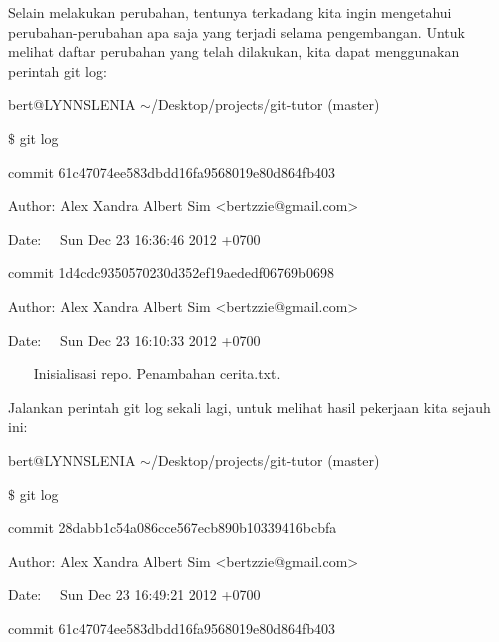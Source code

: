 \vspace{12pt}
\hspace*{0.50in}Selain melakukan perubahan, tentunya terkadang kita ingin mengetahui perubahan-perubahan apa saja yang terjadi selama pengembangan. Untuk melihat daftar perubahan yang telah dilakukan, kita dapat menggunakan perintah git log: \par
\noindent 
{\fontsize{10pt}{10pt}\selectfont bert@LYNNSLENIA  $  \sim  $/Desktop/projects/git-tutor (master)} \par
\noindent 
{\fontsize{10pt}{10pt}\selectfont  $  \$  $ git log} \par
\noindent 
{\fontsize{10pt}{10pt}\selectfont commit 61c47074ee583dbdd16fa9568019e80d864fb403} \par
\noindent 
{\fontsize{10pt}{10pt}\selectfont Author: Alex Xandra Albert Sim <bertzzie@gmail.com>} \par
\noindent 
{\fontsize{10pt}{10pt}\selectfont Date:~~ Sun Dec 23 16:36:46 2012 +0700} \par
\noindent 
{\fontsize{10pt}{10pt}\selectfont commit 1d4cdc9350570230d352ef19aededf06769b0698} \par
\noindent 
{\fontsize{10pt}{10pt}\selectfont Author: Alex Xandra Albert Sim <bertzzie@gmail.com>} \par
\noindent 
{\fontsize{10pt}{10pt}\selectfont Date:~~ Sun Dec 23 16:10:33 2012 +0700} \par
\noindent 
\vspace{10pt}
\noindent 
{\fontsize{10pt}{10pt}\selectfont ~~~ Inisialisasi repo. Penambahan cerita.txt.} \par
\vspace{12pt}
\noindent 
Jalankan perintah git log sekali lagi, untuk melihat hasil pekerjaan kita sejauh ini: \par
\noindent 
{\fontsize{10pt}{10pt}\selectfont bert@LYNNSLENIA  $  \sim  $/Desktop/projects/git-tutor (master)} \par
\noindent 
{\fontsize{10pt}{10pt}\selectfont  $  \$  $ git log} \par
\noindent 
{\fontsize{10pt}{10pt}\selectfont commit 28dabb1c54a086cce567ecb890b10339416bcbfa} \par
\noindent 
{\fontsize{10pt}{10pt}\selectfont Author: Alex Xandra Albert Sim <bertzzie@gmail.com>} \par
\noindent 
{\fontsize{10pt}{10pt}\selectfont Date:~~ Sun Dec 23 16:49:21 2012 +0700} \par
\noindent 
{\fontsize{10pt}{10pt}\selectfont commit 61c47074ee583dbdd16fa9568019e80d864fb403} \par
